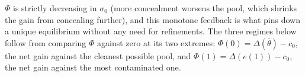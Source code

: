 $\Phi$ is strictly decreasing in $\sigma_0$ (more concealment worsens the pool, which shrinks the gain from concealing further), and this monotone feedback is what pins down a unique equilibrium without any need for refinements. The three regimes below follow from comparing $\Phi$ against zero at its two extremes: $\Phi(0)=\Delta(\bar{\theta})-c_0$, the net gain against the cleanest possible pool, and $\Phi(1)=\Delta(e(1))-c_0$, the net gain against the most contaminated one.
